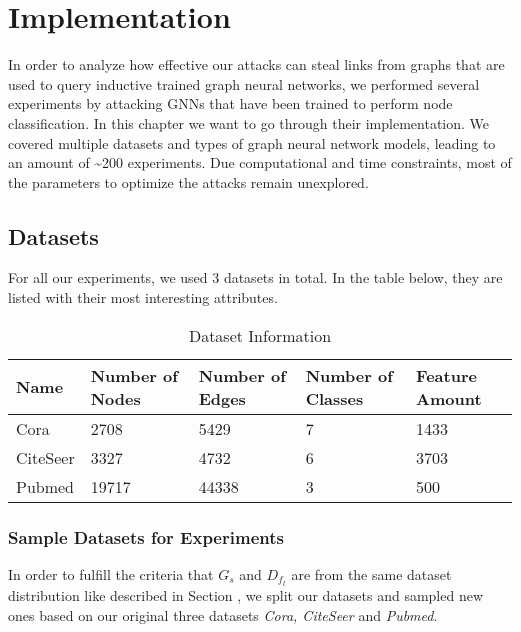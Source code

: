 \chapter{Implementation}

  In order to analyze how effective our attacks can steal links from graphs that are used to query inductive trained graph neural networks, we performed several experiments by attacking GNNs that have been trained to perform node classification.
  In this chapter we want to go through their implementation.
  We covered multiple datasets and types of graph neural network models, leading to an amount of \textasciitilde200 experiments.
  Due computational and time constraints, most of the parameters to optimize the attacks remain unexplored.

  \section{Datasets}

    For all our experiments, we used 3 datasets in total.
    In the table below, they are listed with their most interesting attributes.

    \vspace{0.48cm}
    \begin{table}[!h]
      \centering
      \footnotesize
      \begin{tabular}{l|l|l|l|l}
        \toprule
        Name & Number of Nodes & Number of Edges & Number of Classes & Feature Amount \\
        \midrule
        Cora & 2708            & 5429            & 7                 & 1433 \\
        CiteSeer & 3327        & 4732            & 6                 & 3703 \\
        Pubmed & 19717         & 44338           & 3                 & 500 \\
        \bottomrule
      \end{tabular}
      \caption{Dataset Information}
      \label{table:datasets}
    \end{table}

    \subsection*{Sample Datasets for Experiments}

      In order to fulfill the criteria that $G_s$ and $D_{f_t}$ are from the same dataset distribution like described in Section , we split our datasets and sampled new ones based on our original three datasets \emph{Cora, CiteSeer} and \emph{Pubmed}.

